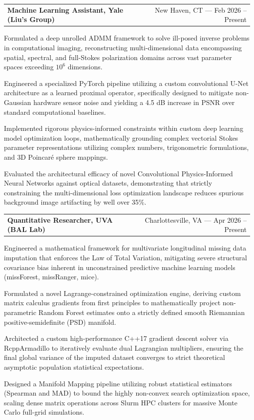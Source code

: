 \documentclass[letterpaper,10pt]{article}
\makeatletter
\newcommand{\resumeItemListStart}{
  \vspace{-4pt}
  \begin{list}{\textbullet}{
    \setlength{\leftmargin}{0.15in}
    \setlength{\labelwidth}{0.15in}
    \setlength{\labelsep}{0.05in}
    \setlength{\itemsep}{0pt} 
    \setlength{\parsep}{0pt}
    \setlength{\topsep}{0pt}
    \setlength{\partopsep}{0pt}
}}
\newcommand{\resumeItemListEnd}{\end{list}\vspace{-1pt}}
\newcommand{\resumeItem}[1]{\item\small{#1}}
\newcommand{\resumeHeading}[2]{
  \item[]
    \begin{tabular*}{\linewidth}[t]{@{}l@{\extracolsep{\fill}}r@{}}
      #1 & #2 \\
    \end{tabular*}\vspace{-2pt} 
}
\makeatother
\begin{document}
    \resumeHeading{\textbf{Machine Learning Assistant, Yale (Liu's Group)}}{New Haven, CT --- Feb 2026 -- Present}
      \resumeItemListStart
        \resumeItem{Formulated a deep unrolled ADMM framework to solve ill-posed inverse problems in computational imaging, reconstructing multi-dimensional data encompassing spatial, spectral, and full-Stokes polarization domains across vast parameter spaces exceeding $10^6$ dimensions.}
        \resumeItem{Engineered a specialized PyTorch pipeline utilizing a custom convolutional U-Net architecture as a learned proximal operator, specifically designed to mitigate non-Gaussian hardware sensor noise and yielding a 4.5 dB increase in PSNR over standard computational baselines.}
        \resumeItem{Implemented rigorous physics-informed constraints within custom deep learning model optimization loops, mathematically grounding complex vectorial Stokes parameter representations utilizing complex numbers, trigonometric formulations, and 3D Poincaré sphere mappings.}
        \resumeItem{Evaluated the architectural efficacy of novel Convolutional Physics-Informed Neural Networks against optical datasets, demonstrating that strictly constraining the multi-dimensional loss optimization landscape reduces spurious background image artifacting by well over 35\%.}
      \resumeItemListEnd

    \resumeHeading{\textbf{Quantitative Researcher, UVA (BAL Lab)}}{Charlottesville, VA --- Apr 2026 -- Present}
      \resumeItemListStart
        \resumeItem{Engineered a mathematical framework for multivariate longitudinal missing data imputation that enforces the Law of Total Variation, mitigating severe structural covariance bias inherent in unconstrained predictive machine learning models (missForest, missRanger, mice).}
        \resumeItem{Formulated a novel Lagrange-constrained optimization engine, deriving custom matrix calculus gradients from first principles to mathematically project non-parametric Random Forest estimates onto a strictly defined smooth Riemannian positive-semidefinite (PSD) manifold.}
        \resumeItem{Architected a custom high-performance C++17 gradient descent solver via RcppArmadillo to iteratively evaluate dual Lagrangian multipliers, ensuring the final global variance of the imputed dataset converges to strict theoretical asymptotic population statistical expectations.}
        \resumeItem{Designed a Manifold Mapping pipeline utilizing robust statistical estimators (Spearman and MAD) to bound the highly non-convex search optimization space, scaling dense matrix operations across Slurm HPC clusters for massive Monte Carlo full-grid simulations.}
      \resumeItemListEnd
\end{document}
